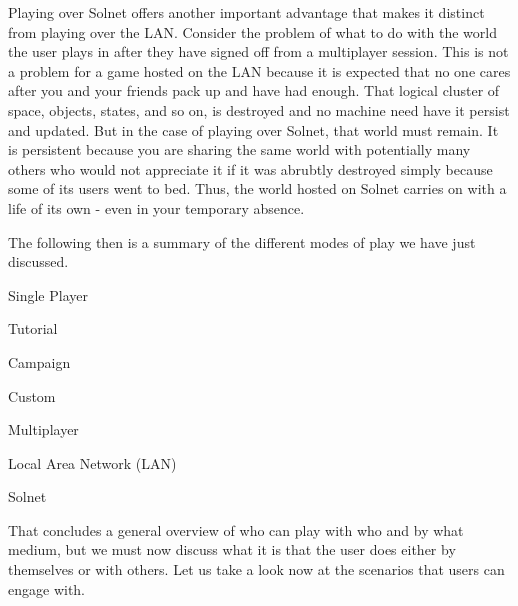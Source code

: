 Playing over Solnet offers another important advantage that makes it distinct from playing over the LAN. Consider the problem of what to do with the world the user plays in after they have signed off from a multiplayer session. This is not a problem for a game hosted on the LAN because it is expected that no one cares after you and your friends pack up and have had enough. That logical cluster of space, objects, states, and so on, is destroyed and no machine need have it persist and updated. But in the case of playing over Solnet, that world must remain. It is persistent because you are sharing the same world with potentially many others who would not appreciate it if it was abrubtly destroyed simply because some of its users went to bed. Thus, the world hosted on Solnet carries on with a life of its own - even in your temporary absence.

The following then is a summary of the different modes of play we have just discussed.

\startitemize[4]
    \item Single Player
        \startitemize[4]
        \item Tutorial
        \item Campaign
        \item Custom
        \stopitemize

    \item Multiplayer
        \startitemize[4]
        \item Local Area Network (LAN)
        \item Solnet
        \stopitemize
\stopitemize

That concludes a general overview of who can play with who and by what medium, but we must now discuss what it is that the user does either by themselves or with others. Let us take a look now at the scenarios that users can engage with.

